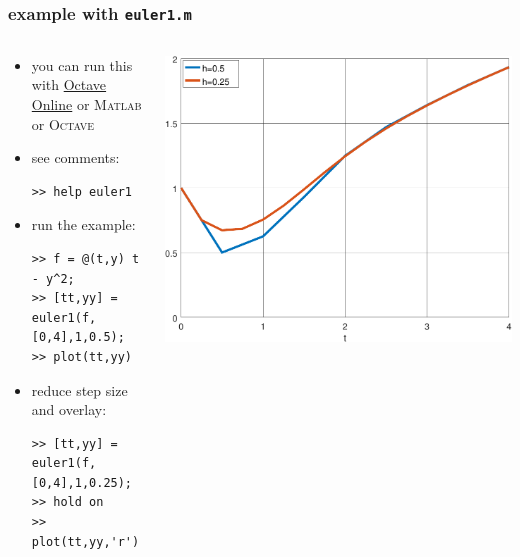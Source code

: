 \documentclass[urlcolor=blue,dvipsnames]{beamer}
\newcommand{\Matlab}{\textsc{Matlab}\xspace}
\newcommand{\Octave}{\textsc{Octave}\xspace}
\begin{document}
\begin{frame}[fragile]
\frametitle{example with \texttt{euler1.m}}

\begin{columns}
\begin{column}{0.55\textwidth}
\begin{itemize}
\item you can run this with \href{https://octave-online.net/}{Octave Online} or \Matlab or \Octave
\item see comments:
\begin{Verbatim}[fontsize=\footnotesize]
>> help euler1
\end{Verbatim}
\item run the example:
\begin{Verbatim}[fontsize=\footnotesize]
>> f = @(t,y) t - y^2;
>> [tt,yy] = euler1(f,[0,4],1,0.5);
>> plot(tt,yy)
\end{Verbatim}
\item reduce step size and overlay:
\begin{Verbatim}[fontsize=\footnotesize]
>> [tt,yy] = euler1(f,[0,4],1,0.25);
>> hold on
>> plot(tt,yy,'r')
\end{Verbatim}
\end{itemize}
\end{column}
\begin{column}{0.45\textwidth}

\mbox{\quad \includegraphics[width=\textwidth]{figs/euler1basic}}
\end{column}
\end{columns}
\end{frame}
\end{document}
